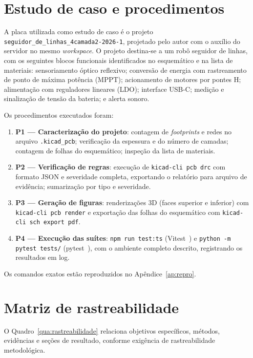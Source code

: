 \section{Estudo de caso e procedimentos}

A placa utilizada como estudo de caso é o projeto
\texttt{seguidor\_de\_linhas\_4camada2-2026-1}, projetado pelo autor com o
auxílio do servidor no mesmo \emph{workspace}. O projeto destina-se a um robô seguidor de
linhas, com os seguintes blocos funcionais identificados no esquemático e na
lista de materiais: sensoriamento óptico reflexivo; conversão de energia com
rastreamento de ponto de máxima potência (MPPT); acionamento de motores por
pontes H; alimentação com reguladores lineares (LDO); interface USB-C;
medição e sinalização de tensão da bateria; e alerta sonoro.

Os procedimentos executados foram:

\begin{enumerate}[leftmargin=1.4em,itemsep=0.25em]
  \item \textbf{P1 --- Caracterização do projeto}: contagem de
        \emph{footprints} e redes no arquivo \texttt{.kicad\_pcb}; verificação
        da espessura e do número de camadas; contagem de folhas do
        esquemático; inspeção da lista de materiais.
  \item \textbf{P2 --- Verificação de regras}: execução de
        \texttt{kicad-cli pcb drc} com formato JSON e severidade completa,
        exportando o relatório para arquivo de evidência; sumarização por
        tipo e severidade.
  \item \textbf{P3 --- Geração de figuras}: renderizações 3D (faces superior
        e inferior) com \texttt{kicad-cli pcb render} e exportação das folhas
        do esquemático com \texttt{kicad-cli sch export pdf}.
  \item \textbf{P4 --- Execução das suítes}: \texttt{npm run test:ts}
        (Vitest~\cite{vitest}) e \texttt{python -m pytest tests/}
        (pytest~\cite{pytest}), com o ambiente completo descrito, registrando
        os resultados em log.
\end{enumerate}

Os comandos exatos estão reproduzidos no Apêndice~\ref{ap:repro}.

\section{Matriz de rastreabilidade}

O Quadro~\ref{qua:rastreabilidade} relaciona objetivos específicos, métodos,
evidências e seções de resultado, conforme exigência de rastreabilidade
metodológica.

